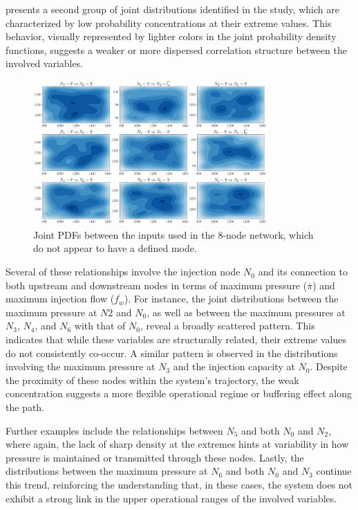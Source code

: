     

 presents a second group of joint distributions identified in the study, which are characterized by low probability concentrations at their extreme values. This behavior, visually represented by lighter colors in the joint probability density functions, suggests a weaker or more dispersed correlation structure between the involved variables.

\begin{figure}[h]
    \begin{center}
        \includegraphics[width=0.8\textwidth]{figures/Chapter_NonLinealCensnet/PDF_inputs_inputs_no_mode.png}
    \end{center}
    \caption{Joint PDFs between the inputs used in the 8-node network, which do not appear to have a defined mode. }
    \label{fig:joint_distributions_input_input_no_mode}
\end{figure}


Several of these relationships involve the injection node $N_0$ and its connection to both upstream and downstream nodes in terms of maximum pressure ($\overline{\pi}$) and maximum injection flow ($\overline{f_w}$). For instance, the joint distributions between the maximum pressure at $N2$ and $N_0$, as well as between the maximum pressures at $N_3$, $N_4$, and $N_6$ with that of $N_0$, reveal a broadly scattered pattern. This indicates that while these variables are structurally related, their extreme values do not consistently co-occur. A similar pattern is observed in the distributions involving the maximum pressure at $N_3$ and the injection capacity at $N_0$. Despite the proximity of these nodes within the system’s trajectory, the weak concentration suggests a more flexible operational regime or buffering effect along the path.

Further examples include the relationships between $N_5$ and both $N_0$ and $N_2$, where again, the lack of sharp density at the extremes hints at variability in how pressure is maintained or transmitted through these nodes. Lastly, the distributions between the maximum pressure at $N_6$ and both $N_0$ and $N_3$ continue this trend, reinforcing the understanding that, in these cases, the system does not exhibit a strong link in the upper operational ranges of the involved variables.




